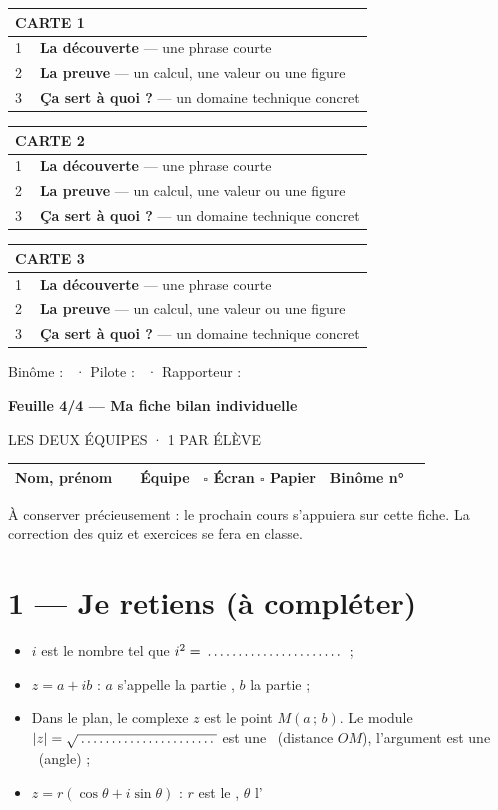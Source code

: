 \documentclass[11pt,a4paper]{article}
\renewcommand{\arraystretch}{1.4}
\newcommand{\case}{$\square$}
\newcommand{\pointilles}{\makebox[3.5cm]{\dotfill}}
\newcommand{\feuille}[3]{%
\begin{center}
  {\bfseries\large Feuille #1 --- #2}\\[2pt]
  {\small\colorbox{gray!15}{\parbox{0.5\textwidth}{\centering #3}}}
\end{center}}
\begin{document}
\newcommand{\carte}[1]{%
\begin{center}
\renewcommand{\arraystretch}{1.9}
\begin{tabularx}{\textwidth}{|c|X|}
  \hline
  \multicolumn{2}{|l|}{\cellcolor{gray!15}\textbf{CARTE #1}} \\ \hline
  \textcircled{1} & \textbf{La découverte} --- une phrase courte
  \\[1.1cm] \hline
  \textcircled{2} & \textbf{La preuve} --- un calcul, une valeur ou une figure
  \\[1.1cm] \hline
  \textcircled{3} & \textbf{Ça sert à quoi ?} --- un domaine technique concret
  \\[1.1cm] \hline
\end{tabularx}
\end{center}}

\carte{1}
\carte{2}
\carte{3}

\vfill
\begin{center}
Binôme : \pointilles\ · Pilote : \pointilles\ · Rapporteur : \pointilles
\end{center}

\newpage
\feuille{4/4}{Ma fiche bilan individuelle}{LES DEUX ÉQUIPES · 1 PAR ÉLÈVE}

\begin{center}
\renewcommand{\arraystretch}{2}
\begin{tabularx}{\textwidth}{|l|X|l|c|l|X|}
  \hline
  \textbf{Nom, prénom} & & \textbf{Équipe} & \case{} Écran \; \case{} Papier &
  \textbf{Binôme n°} & \\ \hline
\end{tabularx}
\end{center}

À conserver précieusement : le prochain cours s'appuiera sur cette fiche. La
correction des quiz et exercices se fera en classe.

\section*{1 --- Je retiens (à compléter)}

\begin{itemize}
  \item $i$ est le nombre tel que $i^2 = \pointilles$ ;
  \item $z = a + ib$ : $a$ s'appelle la partie \pointilles, $b$ la partie
        \pointilles ;
  \item Dans le plan, le complexe $z$ est le point $M(a\,;\,b)$. Le module
        $|z| = \sqrt{\pointilles}$ est une \pointilles\ (distance $OM$),
        l'argument est une \pointilles\ (angle) ;
  \item $z = r(\cos\theta + i\sin\theta)$ : $r$ est le \pointilles,
        $\theta$ l'\pointilles
\end{itemize}
\end{document}
